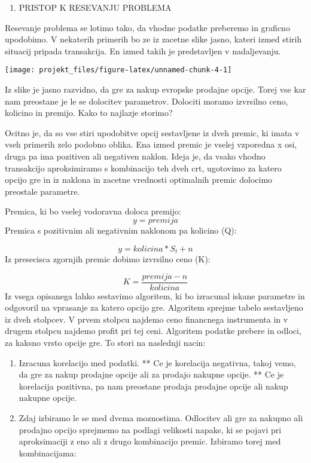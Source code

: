 \documentclass[
]{article}
\providecommand{\tightlist}{%
  \setlength{\itemsep}{0pt}\setlength{\parskip}{0pt}}
\begin{document}
\begin{enumerate}
\def\labelenumi{\arabic{enumi}.}
\setcounter{enumi}{1}
\tightlist
\item
  PRISTOP K RESEVANJU PROBLEMA
\end{enumerate}

Resevanje problema se lotimo tako, da vhodne podatke preberemo in
graficno upodobimo. V nekaterih primerih bo ze iz zacetne slike jasno,
kateri izmed stirih situacij pripada transakcija. En izmed takih je
predstavljen v nadaljevanju.

\begin{center}\texttt{[image: projekt\_files/figure-latex/unnamed-chunk-4-1]} \end{center}

Iz slike je jasno razvidno, da gre za nakup evropske prodajne opcije.
Torej vse kar nam preostane je le se dolocitev parametrov. Dolociti
moramo izvrsilno ceno, kolicino in premijo. Kako to najlazje storimo?

Ocitno je, da so vse stiri upodobitve opcij sestavljene iz dveh premic,
ki imata v vseh primerih zelo podobno oblika. Ena izmed premic je vselej
vzporedna x osi, druga pa ima pozitiven ali negativen naklon. Ideja je,
da vsako vhodno transakcijo aproksimiramo s kombinacijo teh dveh crt,
ugotovimo za katero opcijo gre in iz naklona in zacetne vrednosti
optimalnih premic dolocimo preostale parametre.

Premica, ki bo vselej vodoravna doloca premijo: \[ y =  premija \]
Premica s pozitivnim ali negativnim naklonom pa kolicino (Q):

\[ y =  kolicina * S_t + n\] Iz presecisca zgornjih premic dobimo
izvrsilno ceno (K):

\[ K = \frac{premija - n}{kolicina} \] Iz vsega opisanega lahko
sestavimo algoritem, ki bo izracunal iskane parametre in odgovoril na
vprasanje za katero opcijo gre. Algoritem sprejme tabelo sestavljeno iz
dveh stolpcev. V prvem stolpcu najdemo ceno financnega instrumenta in v
drugem stolpcu najdemo profit pri tej ceni. Algoritem podatke prebere in
odloci, za kaksno vrsto opcije gre. To stori na naslednji nacin:

\begin{enumerate}
\def\labelenumi{\arabic{enumi}.}
\item
  Izracuna korelacijo med podatki. ** Ce je korelacija negativna, takoj
  vemo, da gre za nakup prodajne opcije ali za prodajo nakupne opcije.
  ** Ce je korelacija pozitivna, pa nam preostane prodaja prodajne
  opcije ali nakup nakupne opcije.
\item
  Zdaj izbiramo le se med dvema moznostima. Odlocitev ali gre za nakupno
  ali prodajno opcijo sprejmemo na podlagi velikosti napake, ki se
  pojavi pri aproksimaciji z eno ali z drugo kombinacijo premic.
  Izbiramo torej med kombinacijama:
\end{enumerate}
\end{document}
